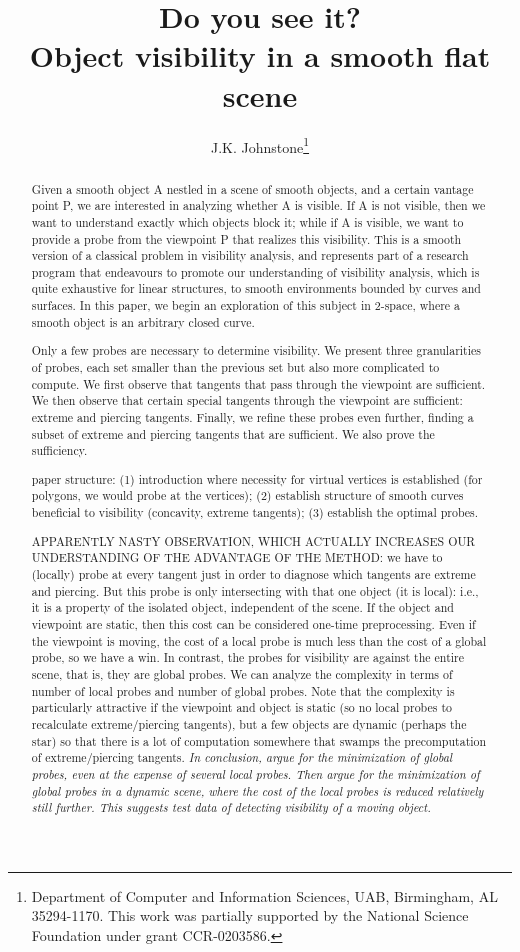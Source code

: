 \documentclass[12pt]{article}
\title{Do you see it?\\Object visibility in a smooth flat scene}
\author{J.K. Johnstone\thanks{Department of Computer and 
    Information Sciences, UAB, Birmingham, AL 35294-1170.  This work
    was partially supported by the National Science Foundation under grant CCR-0203586.}}
\begin{document}
\maketitle

\begin{abstract}
Given a smooth object A nestled in a scene of smooth objects, and
a certain vantage point P, we are interested in analyzing whether A is visible.
If A is not visible, then we want to understand exactly which objects block it;
while if A is visible, we want to provide a probe from the viewpoint P that realizes
this visibility.
This is a smooth version of a classical problem in visibility analysis,
and represents part of a research program that endeavours to promote
our understanding of visibility analysis, which is quite exhaustive for linear structures,
to smooth environments bounded by curves and surfaces.
In this paper, we begin an exploration of this subject 
in 2-space, where a smooth object is an arbitrary closed curve.

Only a few probes are necessary to determine visibility.
We present three granularities of probes, each set smaller than the previous set but
also more complicated to compute.
We first observe that tangents that pass through the viewpoint are sufficient.
We then observe that certain special tangents through the viewpoint are sufficient:
extreme and piercing tangents.
Finally, we refine these probes even further, finding a subset of extreme
and piercing tangents that are sufficient.
We also prove the sufficiency.

paper structure: (1) introduction where necessity for virtual vertices is established
(for polygons, we would probe at the vertices);
(2) establish structure of smooth curves beneficial to visibility (concavity, 
extreme tangents); (3) establish the optimal probes.

APPARENTLY NASTY OBSERVATION, WHICH ACTUALLY INCREASES OUR UNDERSTANDING OF THE
ADVANTAGE OF THE METHOD: we have to (locally) probe at every tangent just in order to diagnose
which tangents are extreme and piercing. But this probe is only intersecting with that
one object (it is local): 
i.e., it is a property of the isolated object, independent of the scene.
If the object and viewpoint are static, then this cost can be considered one-time
preprocessing.
Even if the viewpoint is moving, the cost of a local probe is much less than the
cost of a global probe, so we have a win.
In contrast, the probes for visibility are against the entire scene, that is, they are 
global probes.
We can analyze the complexity in terms of number of local probes and number of global
probes.
Note that the complexity is particularly attractive if the viewpoint and object 
is static (so no local probes to recalculate extreme/piercing tangents),
but a few objects are dynamic (perhaps the star) so that there is a lot of computation
somewhere that swamps the precomputation of extreme/piercing tangents.
{\em In conclusion, argue for the minimization of global probes, even at the expense
of several local probes.  Then argue for the minimization of global probes in a dynamic
scene, where the cost of the local probes is reduced relatively still further.
This suggests test data of detecting visibility of a moving object.}


\end{abstract}
\end{document}
